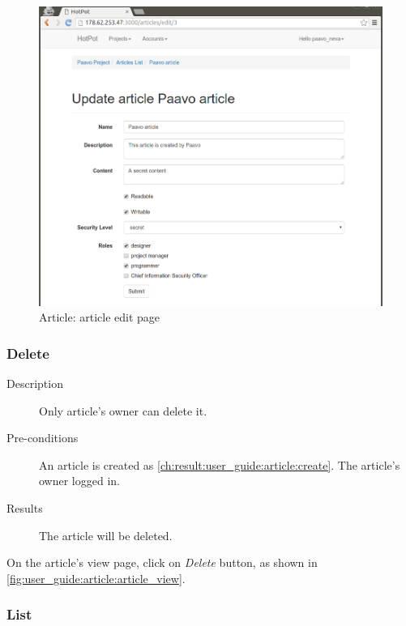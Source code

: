 \begin{figure}[bth]
\myfloatalign
\includegraphics[width=1.0\linewidth]{gfx/chapter_5/article/article_edit}
\caption[Article: article view page]{Article: article edit page}
\label{fig:user_guide:article:article_edit}
\end{figure}

\subsubsection{Delete}
\label{ch:result:user_guide:article:delete}

\begin{description}
\item[Description] Only article's owner can delete it.
\item[Pre-conditions] An article is created as \autoref{ch:result:user_guide:article:create}.
The article's owner logged in.
\item[Results] The article will be deleted.
\end{description}

On the article's view page, click on \emph{Delete} button, as shown in \autoref{fig:user_guide:article:article_view}.

\subsubsection{List}
\label{ch:result:user_guide:article:list}

